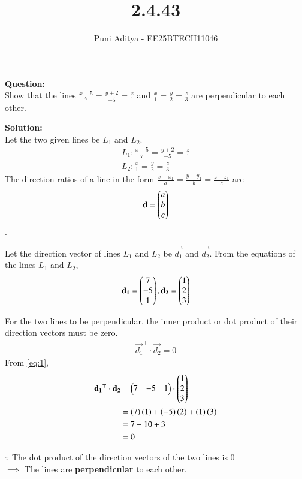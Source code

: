 \documentclass[journal]{IEEEtran}
\begin{document}
\title{2.4.43}
\author{Puni Aditya - EE25BTECH11046}
\maketitle

\textbf{Question:}\\
Show that the lines $\frac{x-5}{7}=\frac{y+2}{-5}=\frac{z}{1}$ and $\frac{x}{1}=\frac{y}{2}=\frac{z}{3}$ are perpendicular to each other.

\textbf{Solution:}\\
Let the two given lines be $L_1$ and $L_2$.
\begin{align*}
    L_1: \frac{x-5}{7} = \frac{y+2}{-5} = \frac{z}{1} \\
    L_2: \frac{x}{1} = \frac{y}{2} = \frac{z}{3}
\end{align*}
The direction ratios of a line in the form $\frac{x-x_1}{a} = \frac{y-y_1}{b} = \frac{z-z_1}{c}$ are
\begin{align*}
\mathbf{d} = \begin{pmatrix}a \\ b \\ c\end{pmatrix}
\end{align*}.

Let the direction vector of lines $L_1$ and $L_2$ be $\vec{d_1}$ and $\vec{d_2}$.
From the equations of the lines $L_1$ and $L_2$,
\begin{align}
    \mathbf{d_1} = \begin{pmatrix}7 \\ -5 \\ 1\end{pmatrix}, 
    \mathbf{d_2} = \begin{pmatrix}1 \\ 2 \\ 3\end{pmatrix}
\end{align}

For the two lines to be perpendicular, the inner product or dot product of their direction vectors must be zero.
\begin{align}
    \vec{d_1}^\top \cdot \vec{d_2} = 0 \label{eq:1}
\end{align}
From \ref{eq:1},
\begin{align}
    \mathbf{d_1}^\top \cdot \mathbf{d_2} &= \begin{pmatrix}7&-5&1\end{pmatrix} \cdot \begin{pmatrix}1 \\ 2 \\ 3\end{pmatrix} \\
    &= \left(7\right)\left(1\right) + \left(-5\right)\left(2\right) + \left(1\right)\left(3\right) \\
    &= 7 - 10 + 3 \\
    &= 0
\end{align}

$\because$ The dot product of the direction vectors of the two lines is 0 \\
$\implies$ The lines are \textbf{perpendicular} to each other.
\end{document}
